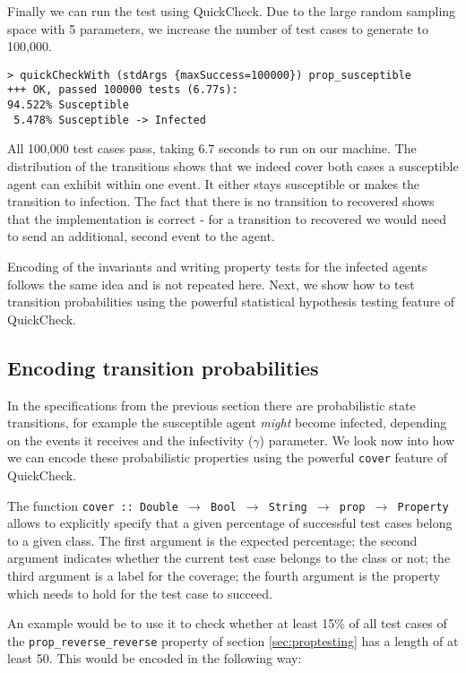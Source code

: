 Finally we can run the test using QuickCheck. Due to the large random sampling space with 5 parameters, we increase the number of test cases to generate to 100,000.

\begin{footnotesize}
\begin{verbatim}
> quickCheckWith (stdArgs {maxSuccess=100000}) prop_susceptible
+++ OK, passed 100000 tests (6.77s):
94.522% Susceptible
 5.478% Susceptible -> Infected
\end{verbatim}
\end{footnotesize}

All 100,000 test cases pass, taking 6.7 seconds to run on our machine. The distribution of the transitions shows that we indeed cover both cases a susceptible agent can exhibit within one event. It either stays susceptible or makes the transition to infection. The fact that there is no transition to recovered shows that the implementation is correct - for a transition to recovered we would need to send an additional, second event to the agent.

Encoding of the invariants and writing property tests for the infected agents follows the same idea and is not repeated here. Next, we show how to test transition probabilities using the powerful statistical hypothesis testing feature of QuickCheck.

\subsection{Encoding transition probabilities}
In the specifications from the previous section there are probabilistic state transitions, for example the susceptible agent \textit{might} become infected, depending on the events it receives and the infectivity ($\gamma$) parameter. We look now into how we can encode these probabilistic properties using the powerful \texttt{cover} feature of QuickCheck.

The function \texttt{cover :: Double $\rightarrow$ Bool $\rightarrow$ String $\rightarrow$ prop $\rightarrow$ Property} allows to explicitly specify that a given percentage of successful test cases belong to a given class. The first argument is the expected percentage; the second argument indicates whether the current test case belongs to the class or not; the third argument is a label for the coverage; the fourth argument is the property which needs to hold for the test case to succeed.

An example would be to use it to check whether at least 15\% of all test cases of the \texttt{prop\_reverse\_reverse} property of section \ref{sec:proptesting} has a length of at least 50. This would be encoded in the following way:

